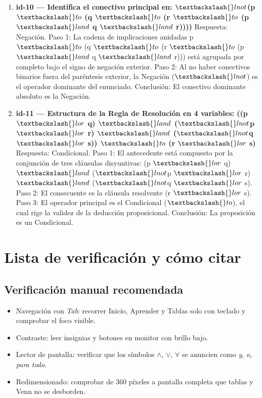 \documentclass[11pt,a4paper,openany]{book}
\begin{document}
\begin{enumerate}[leftmargin=*]
\item \textbf{id-10 --- Identifica el conectivo principal en: $ \textbackslash\{\}lnot $(p $ \textbackslash\{\}to $ (q $ \textbackslash\{\}to $ (r $ \textbackslash\{\}to $ (p $ \textbackslash\{\}land $ q $ \textbackslash\{\}land $ r))))} Respuesta: Negación. Paso 1: La cadena de implicaciones anidadas p $ \textbackslash\{\}to $ (q $ \textbackslash\{\}to $ (r $ \textbackslash\{\}to $ (p $ \textbackslash\{\}land $ q $ \textbackslash\{\}land $ r))) está agrupada por completo bajo el signo de negación exterior. Paso 2: Al no haber conectivos binarios fuera del paréntesis exterior, la Negación ($ \textbackslash\{\}lnot $) es el operador dominante del enunciado. Conclusión: El conectivo dominante absoluto es la Negación.

\item \textbf{id-11 --- Estructura de la Regla de Resolución en 4 variables: ((p $ \textbackslash\{\}lor $ q) $ \textbackslash\{\}land $ ($ \textbackslash\{\}lnot $p $ \textbackslash\{\}lor $ r) $ \textbackslash\{\}land $ ($ \textbackslash\{\}lnot $q $ \textbackslash\{\}lor $ s)) $ \textbackslash\{\}to $ (r $ \textbackslash\{\}lor $ s)} Respuesta: Condicional. Paso 1: El antecedente está compuesto por la conjunción de tres cláusulas disyuntivas: (p $ \textbackslash\{\}lor $ q) $ \textbackslash\{\}land $ ($ \textbackslash\{\}lnot $p $ \textbackslash\{\}lor $ r) $ \textbackslash\{\}land $ ($ \textbackslash\{\}lnot $q $ \textbackslash\{\}lor $ s). Paso 2: El consecuente es la cláusula resolvente (r $ \textbackslash\{\}lor $ s). Paso 3: El operador principal es el Condicional ($ \textbackslash\{\}to $), el cual rige la validez de la deducción proposicional. Conclusión: La proposición es un Condicional.

\end{enumerate}


\chapter{Lista de verificaci\'on y c\'omo citar}
\label{ch:checklist}
\section{Verificaci\'on manual recomendada}
\begin{itemize}[leftmargin=*]
\item Navegaci\'on con \textit{Tab}: recorrer Inicio, Aprender y Tablas solo con teclado y comprobar el foco visible.
\item Contraste: leer insignias y botones en monitor con brillo bajo.
\item Lector de pantalla: verificar que los s\'imbolos $\land$, $\lor$, $\forall$ se anuncien como \textit{y}, \textit{o}, \textit{para todo}.
\item Redimensionado: comprobar de 360 p\'ixeles a pantalla completa que tablas y Venn no se desborden.
\end{itemize}
\end{document}
